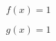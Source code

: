 \documentclass{article}
\begin{document}
\begin{equation}
  \label{eq:1}
  f(x) = 1
\end{equation}

\begin{equation}
  \label{eq:1}
  g(x) = 1
\end{equation}
\end{document}
